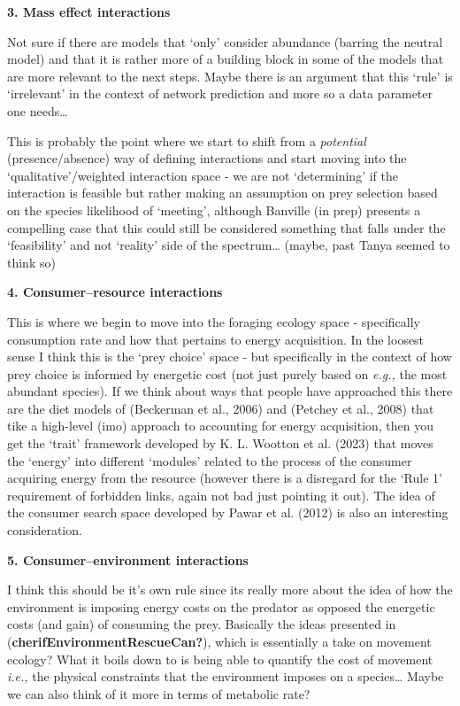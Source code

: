 \documentclass[
]{article}
\begin{document}
\begin{tcolorbox}
\textbf{3. Mass effect interactions}

Not sure if there are models that `only' consider abundance (barring the
neutral model) and that it is rather more of a building block in some of
the models that are more relevant to the next steps. Maybe there is an
argument that this `rule' is `irrelevant' in the context of network
prediction and more so a data parameter one needs\ldots{}

This is probably the point where we start to shift from a
\emph{potential} (presence/absence) way of defining interactions and
start moving into the `qualitative'/weighted interaction space - we are
not `determining' if the interaction is feasible but rather making an
assumption on prey selection based on the species likelihood of
`meeting', although Banville (in prep) presents a compelling case that
this could still be considered something that falls under the
`feasibility' and not `reality' side of the spectrum\ldots{} (maybe,
past Tanya seemed to think so)

\textbf{4. Consumer--resource interactions}

This is where we begin to move into the foraging ecology space -
specifically consumption rate and how that pertains to energy
acquisition. In the loosest sense I think this is the `prey choice'
space - but specifically in the context of how prey choice is informed
by energetic cost (not just purely based on \emph{e.g.,} the most
abundant species). If we think about ways that people have approached
this there are the diet models of (Beckerman et al., 2006) and (Petchey
et al., 2008) that tike a high-level (imo) approach to accounting for
energy acquisition, then you get the `trait' framework developed by K.
L. Wootton et al. (2023) that moves the `energy' into different
`modules' related to the process of the consumer acquiring energy from
the resource (however there is a disregard for the `Rule 1' requirement
of forbidden links, again not bad just pointing it out). The idea of the
consumer search space developed by Pawar et al. (2012) is also an
interesting consideration.

\textbf{5. Consumer--environment interactions}

I think this should be it's own rule since its really more about the
idea of how the environment is imposing energy costs on the predator as
opposed the energetic costs (and gain) of consuming the prey. Basically
the ideas presented in (\textbf{cherifEnvironmentRescueCan?}), which is
essentially a take on movement ecology? What it boils down to is being
able to quantify the cost of movement \emph{i.e.,} the physical
constraints that the environment imposes on a species\ldots{} Maybe we
can also think of it more in terms of metabolic rate?


\end{tcolorbox}
\end{document}
